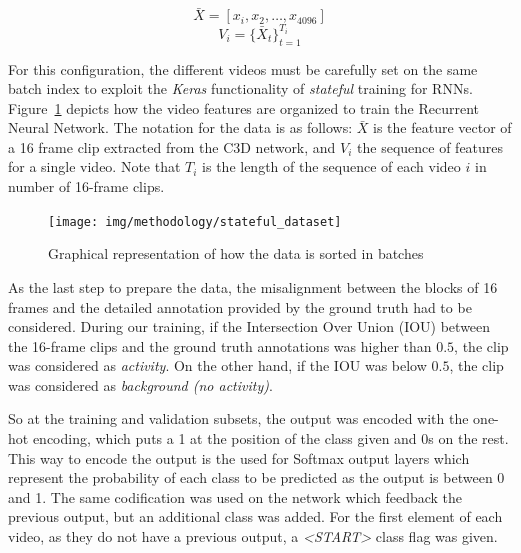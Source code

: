 \begin{equation}
	\bar{X} = [x_i, x_2, \ldots, x_{4096}]
    \label{eq:video_seq_1}
\end{equation}
\begin{equation}
	V_i = \{ \bar{X}_t \}_{t=1}^{T_i}
    \label{eq:video_seq_2}
\end{equation}

For this configuration, the different videos must be carefully set on the same batch index to exploit the \textit{Keras} functionality of \textit{stateful} training for RNNs. Figure~\ref{fig:stateful_dataset} depicts how the video features are organized to train the Recurrent Neural Network. The notation for the data is as follows: $\bar{X}$ is the feature vector of a 16 frame clip extracted from the C3D network, and $V_i$ the sequence of features for a single video. Note that $T_i$ is the length of the sequence of each video $i$ in number of 16-frame clips.

\begin{figure}[ht]
\begin{center}
\texttt{[image: img/methodology/stateful\_dataset]}
\end{center}
\caption{Graphical representation of how the data is sorted in batches}
\label{fig:stateful_dataset}
\end{figure}



As the last step to prepare the data, the misalignment between the blocks of 16 frames and the detailed annotation provided by the ground truth had to be considered. During our training, if the Intersection Over Union (IOU) between the 16-frame clips and the ground truth annotations was higher than $0.5$, the clip was considered as \textit{activity}. On the other hand, if the IOU was below $0.5$, the clip was considered as \textit{background (no activity)}. %

So at the training and validation subsets, the output was encoded with the one-hot encoding, which puts a 1 at the position of the class given and 0s on the rest.  This way to encode the output is the used for Softmax output layers which represent the probability of each class to be predicted as the output is between 0 and 1. The same codification was used on the network which feedback the previous output, but an additional class was added. For the first element of each video, as they do not have a previous output, a \textit{\textless START\textgreater} class flag was given.

